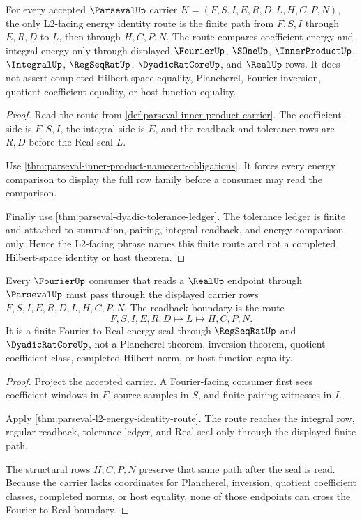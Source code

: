 \begin{theorem}
\label{thm:parseval-l2-energy-identity-route}
For every accepted $\ParsevalUp$ carrier $K=(F,S,I,E,R,D,L,H,C,P,N)$, the only L2-facing energy identity route is the finite path from $F,S,I$ through $E,R,D$ to $L$, then through $H,C,P,N$. The route compares coefficient energy and integral energy only through displayed $\FourierUp$, $\SOneUp$, $\InnerProductUp$, $\IntegralUp$, $\RegSeqRatUp$, $\DyadicRatCoreUp$, and $\RealUp$ rows. It does not assert completed Hilbert-space equality, Plancherel, Fourier inversion, quotient coefficient equality, or host function equality.
\end{theorem}
\begin{proof}
Read the route from \autoref{def:parseval-inner-product-carrier}. The coefficient side is $F,S,I$, the integral side is $E$, and the readback and tolerance rows are $R,D$ before the Real seal $L$.

Use \autoref{thm:parseval-inner-product-namecert-obligations}. It forces every energy comparison to display the full row family before a consumer may read the comparison.

Finally use \autoref{thm:parseval-dyadic-tolerance-ledger}. The tolerance ledger is finite and attached to summation, pairing, integral readback, and energy comparison only. Hence the L2-facing phrase names this finite route and not a completed Hilbert-space identity or host theorem.
\end{proof}

\begin{theorem}
\label{thm:parseval-fourier-real-readback-boundary}
Every $\FourierUp$ consumer that reads a $\RealUp$ endpoint through $\ParsevalUp$ must pass through the displayed carrier rows $F,S,I,E,R,D,L,H,C,P,N$. The readback boundary is the route
$$
F,S,I,E,R,D \longmapsto L \longmapsto H,C,P,N .
$$
It is a finite Fourier-to-Real energy seal through $\RegSeqRatUp$ and $\DyadicRatCoreUp$, not a Plancherel theorem, inversion theorem, quotient coefficient class, completed Hilbert norm, or host function equality.
\end{theorem}
\begin{proof}
Project the accepted carrier. A Fourier-facing consumer first sees coefficient windows in $F$, source samples in $S$, and finite pairing witnesses in $I$.

Apply \autoref{thm:parseval-l2-energy-identity-route}. The route reaches the integral row, regular readback, tolerance ledger, and Real seal only through the displayed finite path.

The structural rows $H,C,P,N$ preserve that same path after the seal is read. Because the carrier lacks coordinates for Plancherel, inversion, quotient coefficient classes, completed norms, or host equality, none of those endpoints can cross the Fourier-to-Real boundary.
\end{proof}

